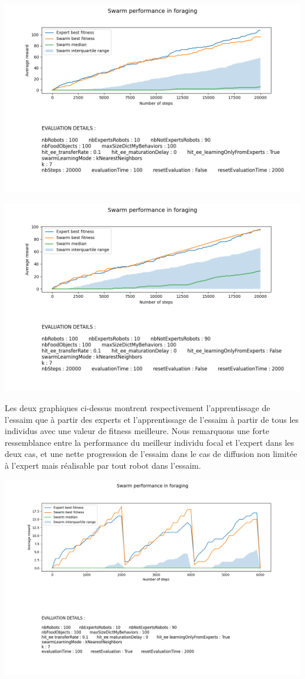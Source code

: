 \documentclass[a4paper, 12pt]{report}
\begin{document}
    \includegraphics[scale=0.5]{images/data_performance_20000_100_knn.png}
    
    \includegraphics[scale=0.5]{images/data_learnFromAll_20000_100_knn.png}
    
    Les deux graphiques ci-dessus montrent respectivement l'apprentissage de l'essaim que à partir des experts et l'apprentissage de l'essaim à partir de tous les individus avec une valeur de fitness meilleure.
    Nous remarquons une forte ressemblance entre la performance du meilleur individu focal et l'expert dans les deux cas, et une nette progression de l'essaim dans le cas de diffusion non limitée à l'expert mais réalisable par tout robot dans l'essaim.
    

    
    
    \includegraphics[scale=0.5]{knn6000_100.png}
    
\end{document}
